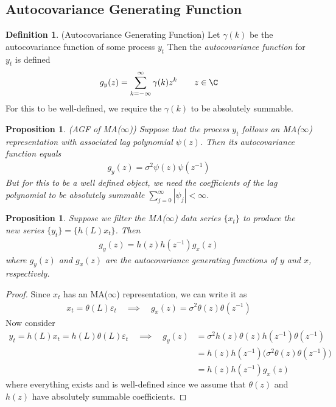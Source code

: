 \documentclass[12pt]{article}
\theoremstyle{plain}
\newtheorem{prop}[thm]{Proposition}
\theoremstyle{definition}
\newtheorem{defn}[thm]{Definition}
\theoremstyle{remark}
\begin{document}
\clearpage
\subsection{Autocovariance Generating Function}

\begin{defn}(Autocovariance Generating Function)
Let $\gamma(k)$ be the autocovariance function of some process $y_t$
Then the \emph{autocovariance function} for $y_t$ is defined
\begin{align*}
  g_y(z) = \sum_{k=-\infty}^\infty \gamma(k)z^k
  \qquad z\in\C
\end{align*}
For this to be well-defined, we require the $\gamma(k)$ to be absolutely
summable.
\end{defn}

\begin{prop}\emph{(AGF of MA($\infty$))}
Suppose that the process $y_t$ follows an MA($\infty$) representation
with associated lag polynomial $\psi(z)$.
Then its autocovariance function equals
\begin{align*}
  g_y(z) = \sigma^2 \psi(z)\psi(z^{-1})
\end{align*}
But for this to be a well defined object, we need the coefficients of
the lag polynomial to be absolutely summable
$\sum_{j=0}^\infty|\psi_j|<\infty$.
\end{prop}

\begin{prop}
Suppose we filter the MA($\infty$) data series $\{x_t\}$ to produce the
new series $\{y_t\} = \{h(L)x_t\}$. Then
\begin{align*}
  g_y(z) = h(z)h(z^{-1})g_x(z)
\end{align*}
where $g_y(z)$ and $g_x(z)$ are the autocovariance generating functions
of $y$ and $x$, respectively.
\end{prop}
\begin{proof}
Since $x_t$ has an MA($\infty$) representation, we can write it as
\begin{align*}
  x_t = \theta(L)\varepsilon_t
  \quad\implies\quad
  g_x(z) = \sigma^2 \theta(z)\theta(z^{-1})
\end{align*}
Now consider
\begin{align*}
  y_t = h(L)x_t = h(L)\theta(L)\varepsilon_t
  \quad\implies\quad
  g_y(z) &= \sigma^2 h(z)\theta(z)h(z^{-1})\theta(z^{-1})
  \\
  &= h(z)h(z^{-1})\big(\sigma^2 \theta(z)\theta(z^{-1})\big)
  \\
  &= h(z)h(z^{-1})g_x(z)
\end{align*}
where everything exists and is well-defined since we assume that
$\theta(z)$ and $h(z)$ have absolutely summable coefficients.
\end{proof}
\end{document}
